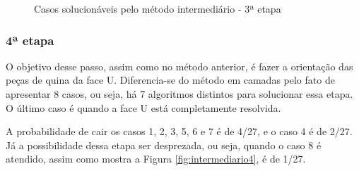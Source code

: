 \begin{figure}[!htb]
    \centering
    \quad %
    \quad %
    \quad %
\caption{Casos solucionáveis pelo método intermediário - 3ª etapa}
\label{fig:intermediariooo3}
\end{figure}

\subsubsection{4ª etapa}

O objetivo desse passo, assim como no método anterior, é fazer a orientação das peças de quina da face U. Diferencia-se do método em camadas pelo fato de apresentar 8 casos, ou seja, há 7 algoritmos distintos para solucionar essa etapa. O último caso é quando a face U está completamente resolvida.
	
	
A probabilidade de cair os casos 1, 2, 3, 5, 6 e 7 é de 4/27, e o caso 4 é de 2/27. Já a possibilidade dessa etapa ser desprezada, ou seja, quando o caso 8 é atendido, assim como mostra a Figura \ref{fig:intermediario4}, é de 1/27. 

